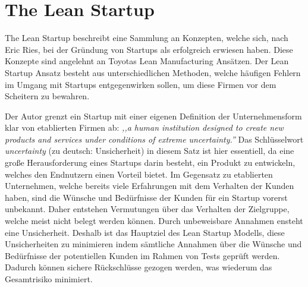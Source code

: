 \section{The Lean Startup}

The Lean Startup beschreibt eine Sammlung an Konzepten, welche sich, nach Eric Ries, bei der Gründung von Startups als erfolgreich erwiesen haben. Diese Konzepte sind angelehnt an Toyotas Lean Manufacturing Ansätzen. Der Lean Startup Ansatz besteht aus unterschiedlichen Methoden, welche häufigen Fehlern im Umgang mit Startups entgegenwirken sollen, um diese Firmen vor dem Scheitern zu bewahren.

Der Autor grenzt ein Startup mit einer eigenen Definition der Unternehmensform klar von etablierten Firmen ab: \textit{,,a human institution designed to create new products and services under conditions of extreme uncertainty.''}
Das Schlüsselwort \textit{uncertainty} (zu deutsch: Unsicherheit) in diesem Satz ist hier essentiell, da eine große Herausforderung eines Startups darin besteht, ein Produkt zu entwickeln, welches den Endnutzern einen Vorteil bietet. Im Gegensatz zu etablierten Unternehmen, welche bereits viele Erfahrungen mit dem Verhalten der Kunden haben, sind die Wünsche und Bedürfnisse der Kunden für ein Startup vorerst unbekannt. Daher entstehen Vermutungen über das Verhalten der Zielgruppe, welche meist nicht belegt werden können. Durch unbeweisbare Annahmen ensteht eine Unsicherheit. Deshalb ist das Hauptziel des Lean Startup Modells, diese Unsicherheiten zu minimieren indem sämtliche Annahmen über die Wünsche und Bedürfnisse der potentiellen Kunden im Rahmen von Tests geprüft werden. Dadurch können sichere Rückschlüsse gezogen werden, was wiederum das Gesamtrisiko minimiert.

